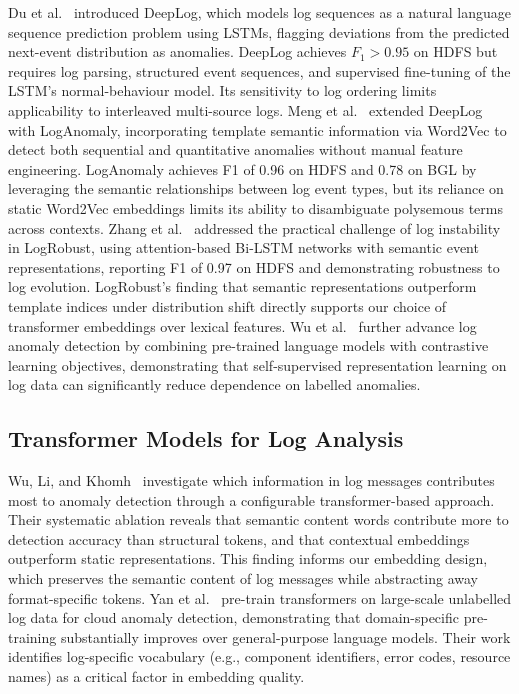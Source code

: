 \documentclass[conference]{IEEEtran}
\begin{document}
Du et al.~\cite{du2017} introduced DeepLog, which models log sequences as a
natural language sequence prediction problem using LSTMs, flagging deviations
from the predicted next-event distribution as anomalies.  DeepLog achieves
$F_1 > 0.95$ on HDFS but requires log parsing, structured event sequences,
and supervised fine-tuning of the LSTM's normal-behaviour model.  Its
sensitivity to log ordering limits applicability to interleaved
multi-source logs.  Meng et al.~\cite{meng2019} extended DeepLog with
LogAnomaly, incorporating template semantic information via Word2Vec to detect
both sequential and quantitative anomalies without manual feature engineering.
LogAnomaly achieves F1 of 0.96 on HDFS and 0.78 on BGL by leveraging the
semantic relationships between log event types, but its reliance on static
Word2Vec embeddings limits its ability to disambiguate polysemous terms
across contexts.  Zhang et al.~\cite{zhang2019} addressed the practical
challenge of log instability in LogRobust, using attention-based Bi-LSTM
networks with semantic event representations, reporting F1 of 0.97 on HDFS
and demonstrating robustness to log evolution.  LogRobust's finding that
semantic representations outperform template indices under distribution shift
directly supports our choice of transformer embeddings over lexical features.
Wu et al.~\cite{wu2023} further advance log anomaly detection by combining
pre-trained language models with contrastive learning objectives, demonstrating
that self-supervised representation learning on log data can significantly
reduce dependence on labelled anomalies.

\subsection{Transformer Models for Log Analysis}

Wu, Li, and Khomh~\cite{wu2025} investigate which information in log
messages contributes most to anomaly detection through a configurable
transformer-based approach.  Their systematic ablation reveals that semantic
content words contribute more to detection accuracy than structural tokens,
and that contextual embeddings outperform static representations.  This
finding informs our embedding design, which preserves the semantic content of
log messages while abstracting away format-specific tokens.  Yan
et al.~\cite{yan2024} pre-train transformers on large-scale unlabelled log
data for cloud anomaly detection, demonstrating that domain-specific
pre-training substantially improves over general-purpose language models.
Their work identifies log-specific vocabulary (e.g., component identifiers,
error codes, resource names) as a critical factor in embedding quality.
\end{document}
